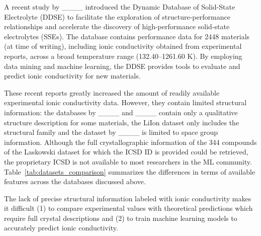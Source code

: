 A recent study by ____ introduced the Dynamic Database of Solid-State Electrolyte (DDSE) to facilitate the exploration of structure-performance relationships and accelerate the discovery of high-performance solid-state electrolytes (SSEs). The database contains performance data for 2448 materials (at time of writing), including ionic conductivity obtained from experimental reports, across a broad temperature range (132.40–1261.60 K). By employing data mining and machine learning, the DDSE provides tools to evaluate and predict ionic conductivity for new materials.

These recent reports greatly increased the amount of readily available experimental ionic conductivity data. However, they contain limited structural information: the databases by ____ and ____ contain only a qualitative structure description for some materials, the LiIon dataset only includes the structural family and the dataset by ____ is limited to space group information. Although the full crystallographic information of the 344 compounds of the Laskowski dataset for which the ICSD ID is provided could be retrieved, the proprietary ICSD is not available to most researchers in the ML community. Table~\ref{tab:datasets_comparison} summarizes the differences in terms of available features across the databases discussed above. 

The lack of precise structural information labeled with ionic conductivity makes it difficult (1) to compare experimental values with theoretical predictions which require full crystal descriptions and (2) to train machine learning models to accurately predict ionic conductivity.


